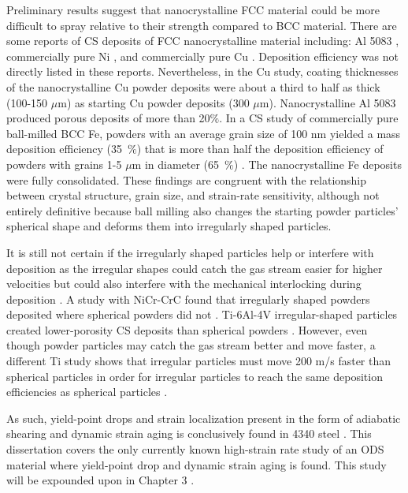 		
		
		Preliminary results suggest that nanocrystalline FCC material could be more difficult to spray relative to their strength compared to BCC material. There are some reports of CS deposits of FCC nanocrystalline material including: Al 5083 \cite{RN1890, RN143, RN1347}, commercially pure Ni \cite{RN3409}, and commercially pure Cu \cite{RN3406}. Deposition efficiency was not directly listed in these reports. Nevertheless, in the Cu study, coating thicknesses of the nanocrystalline Cu powder deposits were about a third to half as thick (100-150 $ \mu $m) as starting Cu powder deposits (300 $ \mu $m). Nanocrystalline Al 5083 produced porous deposits of more than 20$\%$. In a CS study of commercially pure ball-milled BCC Fe, powders with an average grain size of 100 nm yielded a mass deposition efficiency (35 $\%$) that is more than half the deposition efficiency of powders with grains 1-5 $ \mu $m in diameter (65 $\%$) \cite{RN3405}. The nanocrystalline Fe deposits were fully consolidated. These findings are congruent with the relationship between crystal structure, grain size, and strain-rate sensitivity, although not entirely definitive because ball milling also changes the starting powder particles’ spherical shape and deforms them into irregularly shaped particles. 
		
		
		
		It is still not certain if the irregularly shaped particles help or interfere with deposition as the irregular shapes could catch the gas stream easier for higher velocities but could also interfere with the mechanical interlocking during deposition \cite{RN1347}. A study with NiCr-CrC found that irregularly shaped powders deposited where spherical powders did not \cite{RN511}. Ti-6Al-4V irregular-shaped particles created lower-porosity CS deposits than spherical powders \cite{RN3428}. However, even though powder particles may catch the gas stream better and move faster, a different Ti study shows that irregular particles must move 200 m/s faster than spherical particles in order for irregular particles to reach the same deposition efficiencies as spherical particles \cite{RN679}. 
		
		
		
		As such, yield-point drops and strain localization present in the form of adiabatic shearing and dynamic strain aging is conclusively found in 4340 steel \cite{RN267, RN1418, RN2270, RN282, RN1449, RN1419}. This dissertation covers the only currently known high-strain rate study of an ODS material where yield-point drop and dynamic strain aging is found. This study will be expounded upon in Chapter 3 \cite{RN267}. 
		
